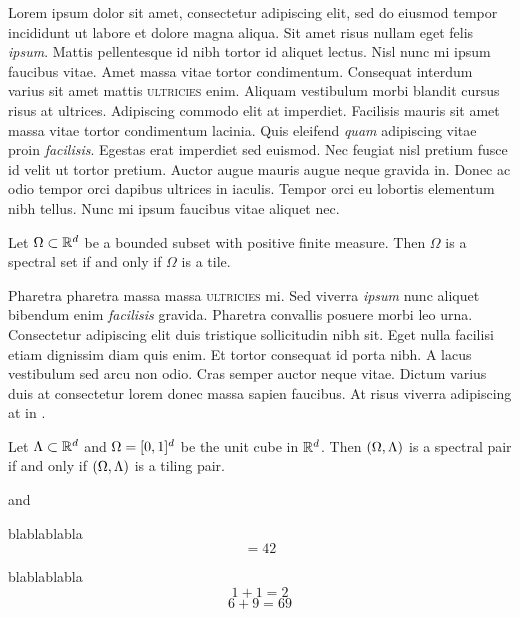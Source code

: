 \documentclass[../thesis.tex]{subfiles}
\begin{document}
Lorem ipsum dolor sit amet, consectetur adipiscing elit, sed do eiusmod tempor incididunt ut labore et dolore magna aliqua. Sit amet risus nullam eget felis \emph{ipsum}. Mattis pellentesque id nibh tortor id aliquet lectus. Nisl nunc mi ipsum faucibus vitae. Amet massa vitae tortor condimentum. Consequat interdum varius sit amet mattis \textsc{ultricies} enim. Aliquam vestibulum morbi blandit cursus risus at ultrices. Adipiscing commodo elit at imperdiet. Facilisis mauris sit amet massa vitae tortor condimentum lacinia. Quis eleifend \emph{quam} adipiscing vitae proin \emph{facilisis}. Egestas erat imperdiet sed euismod. Nec feugiat nisl pretium fusce id velit ut tortor pretium. Auctor augue mauris augue neque gravida in. Donec ac odio tempor orci dapibus ultrices in iaculis. Tempor orci eu lobortis elementum nibh tellus. Nunc mi ipsum faucibus vitae aliquet nec.

\begin{conjecture}\label{conj:fuglede}  
    Let $\Omega\subset \mathbb{R}^d$ be a bounded subset with positive finite measure. Then $\Omega$ is a spectral set if and only if $\Omega$ is a tile. 
\end{conjecture}

Pharetra pharetra massa massa \textsc{ultricies} mi. Sed viverra \emph{ipsum} nunc aliquet bibendum enim \emph{facilisis} gravida. Pharetra convallis posuere morbi leo urna. Consectetur adipiscing elit duis tristique sollicitudin nibh sit. Eget nulla facilisi etiam dignissim diam quis enim. Et tortor consequat id porta nibh. A lacus vestibulum sed arcu non odio. Cras semper auctor neque vitae. Dictum varius duis at consectetur lorem donec massa sapien faucibus. At risus viverra adipiscing at in .

\begin{theorem}\label{thrm:main_result}
    Let $\Lambda\subset \mathbb{R}^d$ and $\Omega=[0,1]^d$ be the unit cube in $\mathbb{R}^d$. Then $(\Omega,\Lambda)$ is a spectral pair if and only if $(\Omega,\Lambda)$ is a tiling pair.
\end{theorem}
and 
\begin{theorem}\label{thrm:another_result}
  blablablabla
  \begin{equation}\label{eq:another_result}
    =42
  \end{equation}
\end{theorem}
\begin{lemma}\label{lem:another_result}
  blablablabla
  \begin{equation}\label{eq:cool_equation}
    1+1=2
  \end{equation}
  \begin{equation}\label{eq:four}
    6+9 = 69
  \end{equation}
\end{lemma}
\end{document}
